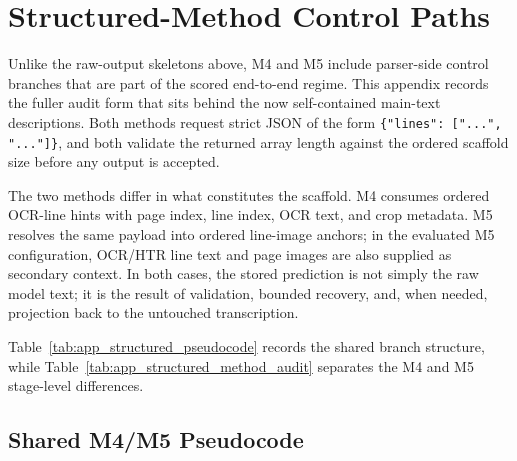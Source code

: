 \FloatBarrier

\section{Structured-Method Control Paths}
\label{sec:appendix_structured_audit}

Unlike the raw-output skeletons above, M4 and M5 include parser-side control branches that are part of the scored end-to-end regime. This appendix records the fuller audit form that sits behind the now self-contained main-text descriptions. Both methods request strict JSON of the form \texttt{\{"lines": ["...", "..."]\}}, and both validate the returned array length against the ordered scaffold size before any output is accepted.

The two methods differ in what constitutes the scaffold. M4 consumes ordered OCR-line hints with page index, line index, OCR text, and crop metadata. M5 resolves the same payload into ordered line-image anchors; in the evaluated M5 configuration, OCR/HTR line text and page images are also supplied as secondary context. In both cases, the stored prediction is not simply the raw model text; it is the result of validation, bounded recovery, and, when needed, projection back to the untouched transcription.

Table~\ref{tab:app_structured_pseudocode} records the shared branch structure, while Table~\ref{tab:app_structured_method_audit} separates the M4 and M5 stage-level differences.

\subsection{Shared M4/M5 Pseudocode}
\label{sec:appendix_structured_pseudocode}

